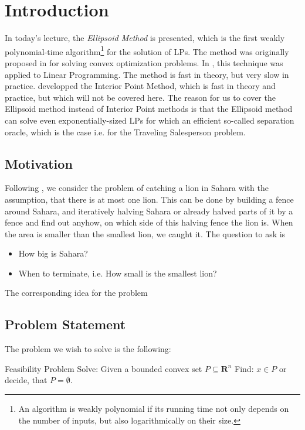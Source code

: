\documentclass[10pt]{article}
\newcommand{\R}{\mathbf{R}}
\begin{document}


\section{Introduction}
In today's lecture, the \emph{Ellipsoid Method} is presented, which is the first weakly polynomial-time algorithm\footnote{An algorithm is weakly polynomial if its running time not only depends on the number of inputs, but also logarithmically on their size.} for the solution of LPs. The method was originally proposed in \cite{shor77} for solving convex optimization problems. In \cite{khachiyan79}, this technique was applied to Linear Programming. The method is fast in theory, but very slow in practice. \cite{kamarkar89} developped the Interior Point Method, which is fast in theory and practice, but which will not be covered here. The reason for us to cover the Ellipsoid method instead of Interior Point methods is that the Ellipsoid method can solve even exponentially-sized LPs for which an efficient so-called separation oracle, which is the case i.e. for the Traveling Salesperson problem. 

\subsection{Motivation}
Following \cite{lovaszschrijver}, we consider the problem of catching a lion in Sahara with the assumption, that there is at most one lion. This can be done by building a fence around Sahara, and iteratively halving Sahara or already halved parts of it by a fence and find out anyhow, on which side of this halving fence the lion is. When the area is smaller than the smallest lion, we caught it. The question to ask is
\begin{itemize}
\item How big is Sahara?
\item When to terminate, i.e. How small is the smallest lion?
\end{itemize}
The corresponding idea for the problem 
\subsection{Problem Statement}
The problem we wish to solve is the following:

Feasibility Problem
Solve: Given a bounded convex set $P\subseteq \R^n$
Find: $x \in P$ or decide, that $P = \emptyset$.
\end{document}
